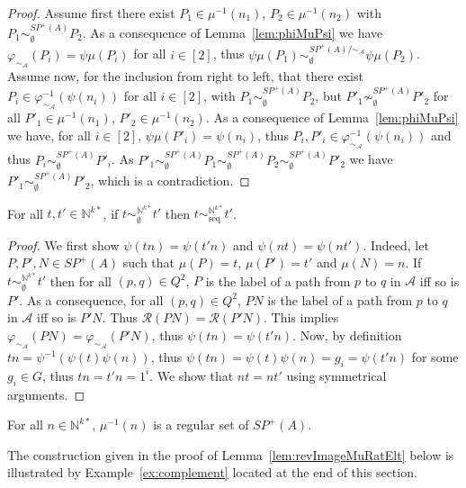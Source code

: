 \documentclass{CSML}
\begin{document}
\begin{proof}
  Assume first there exist $P_1\in\mu^{-1}(n_1)$, $P_2\in\mu^{-1}(n_2)$ with $P_1\sim_\emptyset^{SP^+(A)} P_2$. As a consequence of Lemma~\ref{lem:phiMuPsi} we have $\varphi_{\sim_\mathcal{A}}(P_i)=\psi\mu(P_i)$ for all $i\in[2]$, thus $\psi\mu(P_1)\sim_\emptyset^{SP^+(A)/\mathord\sim_\mathcal{A}} \psi\mu(P_2)$.
Assume now, for the inclusion from right to left, that there exist $P_i\in\varphi_{\sim_\mathcal{A}}^{-1}(\psi(n_i))$ for all $i\in[2]$, with $P_1\sim_\emptyset^{SP^+(A)} P_2$, but $P'_1\not\sim_\emptyset^{SP^+(A)} P'_2$ for all $P'_1\in\mu^{-1}(n_1)$, $P'_2\in\mu^{-1}(n_2)$. As a consequence of Lemma~\ref{lem:phiMuPsi} we have, for all $i\in[2]$, $\psi\mu(P'_i)=\psi(n_i)$, thus $P_i,P'_i\in\varphi^{-1}_{\sim_\mathcal{A}}(\psi(n_i))$ and thus $P_i\sim_\emptyset^{SP^+(A)} P'_i$. As $P'_1\sim_\emptyset^{SP^+(A)} P_1\sim_\emptyset^{SP^+(A)} P_2\sim_\emptyset^{SP^+(A)} P'_2$ we have $P'_1\sim_\emptyset^{SP^+(A)} P'_2$, which is a contradiction.
\end{proof}

\begin{lem}
  \label{lem:pdtSeqEq}
  For all $t,t'\in\mathbb{N}^{k*}$, if $t\sim_\emptyset^{\mathbb{N}^{k*}} t'$ then $t\sim_\text{seq}^{\mathbb{N}^{k*}}t'$.
\end{lem}

\begin{proof}
  We first show $\psi(tn)=\psi(t'n)$ and $\psi(nt)=\psi(nt')$. Indeed, let $P,P',N\in SP^+(A)$ such that $\mu(P)=t$, $\mu(P')=t'$ and $\mu(N)=n$. If $t\sim_\emptyset^{\mathbb{N}^{k*}}t'$ then for all $(p,q)\in Q^2$, $P$ is the label of a path from $p$ to $q$ in $\mathcal{A}$ iff so is $P'$. As a consequence, for all $(p,q)\in Q^2$, $PN$ is the label of a path from $p$ to $q$ in $\mathcal{A}$ iff so is $P'N$. Thus $\mathcal{R}(PN)=\mathcal{R}(P'N)$. This implies $\varphi_{\sim_\mathcal{A}}(PN)=\varphi_{\sim_\mathcal{A}}(P'N)$, thus $\psi(tn)=\psi(t'n)$. Now, by definition $tn=\psi^{-1}(\psi(t)\psi(n))$, thus $\psi(tn)=\psi(t)\psi(n)=g_i=\psi(t'n)$ for some $g_i\in G$, thus $tn=t'n=1^i$. We show that $nt=nt'$ using symmetrical arguments.
\end{proof}

\begin{lem}
  \label{lem:revImageMuRatElt}
  For all $n\in\mathbb{N}^{k*}$, $\mu^{-1}(n)$ is a regular set of $SP^+(A)$.
\end{lem}

The construction given in the proof of Lemma~\ref{lem:revImageMuRatElt} below is illustrated by Example~\ref{ex:complement} located at the end of this section.
\end{document}
